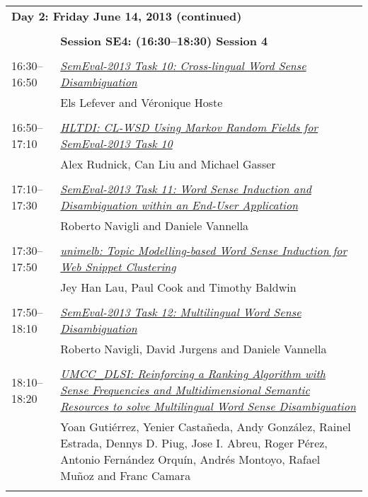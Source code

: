 \begin{tabular}{p{20mm}p{138mm}}
\\
\multicolumn{2}{l}{\bf Day 2: Friday June 14, 2013 (continued)} \\\\
 & {\bf Session SE4: (16:30--18:30) Session 4} \\
\\



16:30--16:50  & \hyperlink{page.158}{\em SemEval-2013 Task 10: Cross-lingual Word Sense Disambiguation}\\
         & Els Lefever and V\'{e}ronique Hoste \\
\\

16:50--17:10  & \hyperlink{page.171}{\em HLTDI: CL-WSD Using Markov Random Fields for SemEval-2013 Task 10}\\
         & Alex Rudnick, Can Liu and Michael Gasser \\
\\

17:10--17:30 & \hyperlink{page.193}{\em SemEval-2013 Task 11: Word Sense Induction and Disambiguation within an End-User Application}\\
         & Roberto Navigli and Daniele Vannella \\
\\

17:30--17:50 & \hyperlink{page.217}{\em unimelb: Topic Modelling-based Word Sense Induction for Web Snippet Clustering}\\
         & Jey Han Lau, Paul Cook and Timothy Baldwin \\
\\


17:50--18:10  & \hyperlink{page.222}{\em SemEval-2013 Task 12: Multilingual Word Sense Disambiguation}\\
         & Roberto Navigli, David Jurgens and Daniele Vannella \\
\\


18:10--18:20  & \hyperlink{page.241}{\em UMCC\_DLSI: Reinforcing a Ranking Algorithm with Sense Frequencies and Multidimensional Semantic Resources to solve Multilingual Word Sense Disambiguation}\\
         & Yoan Guti\'{e}rrez, Yenier Casta\~{n}eda, Andy Gonz\'{a}lez, Rainel Estrada, Dennys D. Piug, Jose I. Abreu, Roger P\'{e}rez, Antonio Fern\'{a}ndez Orqu\'{i}n, Andr\'{e}s Montoyo, Rafael Mu\~{n}oz and Franc Camara \\
\\


\end{tabular}
